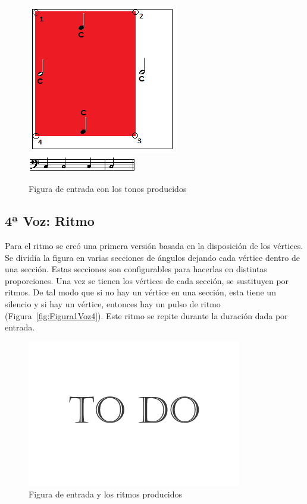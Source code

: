 		\begin{figure}[htbp]
		\centering
		\hspace*{0.0in}
		\includegraphics[scale=1]{graphics/simpletest2-F2F3_2.png}
		\includegraphics[scale=1]{graphics/simpletest3_2-BASSpartitura.png}
		\caption{Figura de entrada con los tonos producidos}
		\label{fig:Figura2Voz3}
		\end{figure}


\subsection{4ª Voz: Ritmo}

Para el ritmo se creó una primera versión basada en la disposición de los vértices. Se dividía la figura en varias secciones de ángulos dejando cada vértice dentro de una sección. Estas secciones son configurables para hacerlas en distintas proporciones. Una vez se tienen los vértices de cada sección, se sustituyen por ritmos. De tal modo que si no hay un vértice en una sección, esta tiene un silencio y si hay un vértice, entonces hay un pulso de ritmo (Figura~\ref{fig:Figura1Voz4}). Este ritmo se repite durante la duración dada por entrada.

		\begin{figure}[htbp]
		\centering
		\hspace*{0.0in}
		\includegraphics[scale=0.57]{graphics/todo.png}
		\caption{Figura de entrada y los ritmos producidos}
		\label{fig:Figur1Voz4}
		\end{figure}

